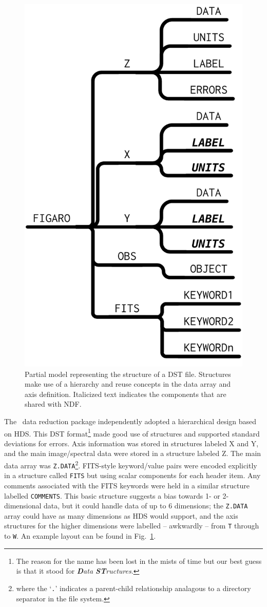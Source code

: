 \documentclass[final,authoryear,5p,times,twocolumn]{elsarticle}
\begin{document}
\begin{figure}[t]
\begin{center}
\includegraphics[width=0.6\columnwidth]{model-dst}
\end{center}
\caption{Partial model representing the structure of a DST file. Structures make
  use of a hierarchy and reuse concepts in the data array and axis
  definition.  Italicized text indicates the components that are shared with NDF.}
\label{fig:dst}
\end{figure}

The \figaro\ data reduction package
\citep[][]{1988igbo.conf..448C,1993ASPC...52..219S}
independently adopted a hierarchical design based on HDS. This DST
format\footnote{The reason for the name has been lost in the mists of
  time but our best guess is that it stood for \emph{\textbf{D}ata
    \textbf{ST}ructures}.} made good use of structures and supported
standard deviations for errors. Axis information was stored in
structures labeled X and Y, and the main image/spectral data were
stored in a structure labeled Z. The main data array was
\texttt{Z.DATA}\footnote{where the `\texttt{.}' indicates a
  parent-child relationship analagous to a directory separator in the
  file system.}. FITS-style keyword/value pairs were encoded
explicitly in a structure called \texttt{FITS} but using scalar
components for each header item. Any comments associated with the FITS
keywords were held in a similar structure labelled
\texttt{COMMENTS}. This basic structure suggests a bias towards 1- or
2-dimensional data, but it could handle data of up to 6 dimensions;
the \texttt{Z.DATA} array could have as many dimensions as HDS would
support, and the axis structures for the higher dimensions were
labelled -- awkwardly -- from \texttt{T} through to \texttt{W}. An
example layout can be found in Fig.~\ref{fig:dst}.
\end{document}
